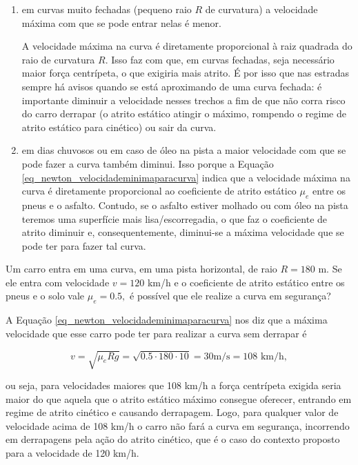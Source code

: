 \begin{enumerate}
    \item [(i)] em curvas muito fechadas (pequeno raio $R$ de curvatura) a velocidade máxima com que se pode entrar nelas é menor. 

    A velocidade máxima na curva é diretamente proporcional à raiz quadrada do raio de curvatura $R$. Isso faz com que, em curvas fechadas, seja necessário maior força centrípeta, o que exigiria mais atrito. É por isso que nas estradas sempre há avisos quando se está aproximando de uma curva fechada: é importante diminuir a velocidade nesses trechos a fim de que não corra risco do carro derrapar (o atrito estático atingir o máximo, rompendo o regime de atrito estático para cinético) ou sair da curva.

    \item [(ii)] em dias chuvosos ou em caso de óleo na pista a maior velocidade com que se pode fazer a curva também diminui. Isso porque a Equação \eqref{eq_newton_velocidademinimaparacurva} indica que a velocidade máxima na curva é diretamente proporcional ao coeficiente de atrito estático $\mu_e$ entre os pneus e o asfalto. Contudo, se o asfalto estiver molhado ou com óleo na pista teremos uma superfície mais lisa/escorregadia, o que faz o coeficiente de atrito diminuir e, consequentemente, diminui-se a máxima velocidade que se pode ter para fazer tal curva.
\end{enumerate}




\vspace{0.3cm}


\begin{exemplo}[Nível I]\label{exemplo_newton_velocidademinimacurvahorizontalex01}

Um carro entra em uma curva, em uma pista horizontal, de raio $R=180$ m. Se ele entra com velocidade $v=120$ km/h e o coeficiente de atrito estático entre os pneus e o solo vale $\mu_e=0.5,$ é possível que ele realize a curva em segurança?

\resolucao

A Equação \eqref{eq_newton_velocidademinimaparacurva} nos diz que a máxima velocidade que esse carro pode ter para realizar a curva sem derrapar é

$$ v=\sqrt{\mu_e R g} = \sqrt{0.5 \cdot 180 \cdot 10} = 30 \text{m/s} = 108 \text{ km/h},$$

\noindent ou seja, para velocidades maiores que 108 km/h a força centrípeta exigida seria maior do que aquela que o atrito estático máximo consegue oferecer, entrando em regime de atrito cinético e causando derrapagem. Logo, para qualquer valor de velocidade acima de 108 km/h o carro não fará a curva em segurança, incorrendo em derrapagens pela ação do atrito cinético, que é o caso do contexto proposto para a velocidade de 120 km/h.

\end{exemplo}



